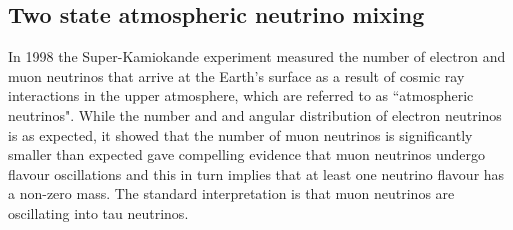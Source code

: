 \subsection{Two state atmospheric neutrino mixing}
In 1998 the Super-Kamiokande experiment measured the number of electron and muon neutrinos that arrive at the Earth’s surface as a result of cosmic ray interactions in the upper atmosphere, which are referred to as ``atmospheric neutrinos". While the number and and angular distribution of electron neutrinos is as expected, it showed that the number of muon neutrinos is significantly smaller than expected gave compelling evidence that muon neutrinos undergo flavour oscillations and this in turn implies that at least one neutrino flavour has a non-zero mass. The standard interpretation is that muon neutrinos are oscillating into tau neutrinos.\cite{King_2004}

